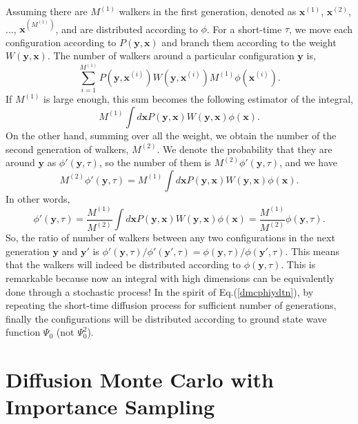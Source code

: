 \documentclass[12pt,letterpaper,UTF8]{report}
\begin{document}
{Assuming there are $M^{(1)}$ walkers in the first generation, denoted as $\bm{x}^{(1)}$, $\bm{x}^{(2)}$, ..., $\bm{x}^{(  M^{(1)}  )}$, and are distributed according to $\phi$. For a short-time $\tau$, we move each configuration according to $P(\bm{y},\bm{x})$ and branch them according to the weight $W(\bm{y},\bm{x})$. The number of walkers around a particular configuration $\bm{y}$ is,
\begin{equation}
\sum_{i=1}^{M^{(1)}} P(\bm{y},\bm{x}^{(i)})W(\bm{y},\bm{x}^{(i)}) M^{(1)} \phi(\bm{x}^{(i)}) . \nonumber
\end{equation}
If $M^{(1)}$ is large enough, this sum becomes the following estimator of the integral,
\begin{equation}
M^{(1)}  \int d\bm{x} P(\bm{y},\bm{x}) W(\bm{y},\bm{x}) \phi(\bm{x}) . \nonumber
\end{equation}
On the other hand, summing over all the weight, we obtain the number of the second generation of walkers, $M^{(2)}$. We denote the probability that they are around $\bm{y}$ as $\phi'(\bm{y},\tau)$, so the number of them is $M^{(2)} \phi'(\bm{y},\tau)$, and we have
\begin{equation}
M^{(2)} \phi'(\bm{y},\tau) = M^{(1)}  \int d\bm{x} P(\bm{y},\bm{x}) W(\bm{y},\bm{x}) \phi(\bm{x}) . \nonumber
\end{equation}
In other words,
\begin{equation}
\phi'(\bm{y},\tau) = \frac{ M^{(1)} }{M^{(2)} }  \int d\bm{x} P(\bm{y},\bm{x}) W(\bm{y},\bm{x}) \phi(\bm{x})
= \frac{ M^{(1)} }{M^{(2)} } \phi(\bm{y},\tau) . \nonumber
\end{equation}
So, the ratio of number of walkers between any two configurations in the next generation $\bm{y}$ and $\bm{y}'$ is $\phi'(\bm{y},\tau)/\phi'(\bm{y}',\tau)=\phi(\bm{y},\tau)/\phi(\bm{y}',\tau)$. This means that the walkers will indeed be distributed according to $ \phi(\bm{y},\tau)$.
This is remarkable because now an integral with high dimensions can be equivalently done through a stochastic process! In the spirit of Eq.(\ref{dmcphiydtn}), by repeating the short-time diffusion process for sufficient number of generations, finally the configurations will be distributed according to ground state wave function $\Psi_0$ (not  $\Psi^2_0$).

\section{ Diffusion Monte Carlo with Importance Sampling} \label{secDMCimp}

}
\end{document}
